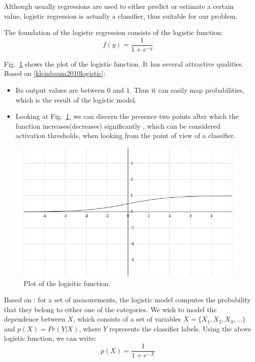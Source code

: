Although usually regressions are used to either predict or estimate a certain value, logistic regression is actually a classifier, thus suitable for our problem. 

The foundation of the logistic regression consists of the logistic function:
\begin{equation*}
f(y) = \frac{1}{1+e^{-y}}
\end{equation*}

Fig.~\ref{pic:logit} shows the plot of the logistic function. It has several attractive qualities. Based on \ref{kleinbaum2010logistic}:

\begin{itemize}
  \item Its output values are between $0$ and $1$. Thus it can easily map probabilities, which is the result of the logistic model.
  \item Looking at Fig.~\ref{pic:logit}, we can discern the presence two points after which the function increases(decreases) significantly , which can be considered activation thresholds, when looking from the point of view of a classifier.  
\end{itemize}

\begin{figure}[h]
	\begin{center}
		\includegraphics[scale=0.5]{figures/logit.png}
	\end{center}
	
	\caption{Plot of the logisitic function.}
	\label{pic:logit}

\end{figure}

Based on \cite{kleinbaum2010logistic,logmodel,statistics}: for a set of measurements, the logistic model computes the probability that they belong to either one of the categories. We wish to model the dependence between $X$, which consists of a set of variables $X = \lbrace X_1,X_2,X_3,... \rbrace$ and $p(X) = Pr(Y \vert X)$, where $Y$ represents the classifier labels. Using the above logistic function, we can write:
\begin{equation*}
p(X) = \frac{1}{1+e^{-X}}
\end{equation*}

